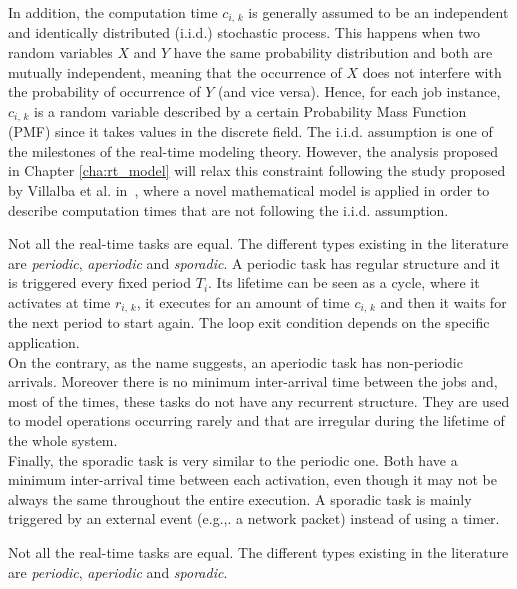 In addition, the computation time \( c_{i,\,k} \) is generally assumed to be an
independent and identically distributed (i.i.d.) stochastic process.
This happens when two random variables \( X \) and \( Y \) have 
the same probability distribution and both are mutually
independent, meaning that the occurrence of \( X \) does not interfere with 
the probability of occurrence of \( Y \) (and vice versa).
Hence, for each job instance, \( c_{i,\,k} \) is a random
variable described by a certain Probability Mass Function (PMF) since it
takes values in the discrete field.
The i.i.d. assumption is one of the milestones of the real-time modeling theory.
However, the analysis proposed in Chapter \ref{cha:rt_model} will relax this 
constraint following the study proposed by Villalba et al.
in~\cite{villalba2017probabilistic}, where a novel mathematical model is applied
in order to describe computation times that are not following the i.i.d.
assumption.

Not all the real-time tasks are equal. The different types existing in
the literature are \emph{periodic}, \emph{aperiodic} and \emph{sporadic}.
A periodic task has regular structure
and it is triggered every fixed period \( T_{i} \). Its lifetime can be seen as
a cycle, where it activates at time \( r_{i,\,k} \), it executes for an amount 
of time \( c_{i,\,k} \) and then it waits for the next period to start again.
The loop exit condition depends on the specific application.\\
On the contrary, as the name suggests, an aperiodic task has non-periodic arrivals.
Moreover there is no minimum inter-arrival time between the jobs and,
most of the times, these tasks do not have any recurrent structure. They are used
to model operations occurring rarely and that are irregular during the lifetime
of the whole system.\\
Finally, the sporadic task is very similar to the periodic one. Both have a minimum
inter-arrival time between each activation, even though it may not be always the
same throughout the entire execution. A sporadic task is mainly triggered by an
external event (e.g.,. a network packet) instead of using a timer.

Not all the real-time tasks are equal. The different types existing in
the literature are \emph{periodic}, \emph{aperiodic} and \emph{sporadic}.


